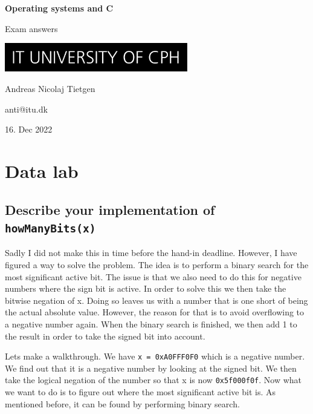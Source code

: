 \documentclass[11pt]{article}
\newcommand{\code}[1]{{\colorbox{lightgray!15}{\color{black}\texttt{#1}}}}
\begin{document}
\begin{titlepage}
    \begin{center}
        \huge
        \textbf{Operating systems and C}

        \vspace{0.5cm}
        Exam answers

        \vspace{3cm}
        \includegraphics[width=0.6\textwidth]{itu.jpeg}

        \vspace{3cm}
        \large
        Andreas Nicolaj Tietgen 
        
        anti@itu.dk

        \vfill
        16. Dec 2022
    \end{center}
\end{titlepage}

\newpage

\tableofcontents

\newpage
\section{Data lab}

\subsection{Describe your implementation of \code{howManyBits(x)}}
Sadly I did not make this in time before the hand-in deadline. However, I have figured a way to 
solve the problem. The idea is to perform a binary search for the most significant active bit.
The issue is that we also need to do this for negative numbers where the sign bit is active. In order to 
solve this we then take the bitwise negation of x. Doing so leaves us with a number that is one short of being the
actual absolute value. However, the reason for that is to avoid overflowing to a negative number again. 
When the binary search is finished, we then add 1 to the result in order to take the signed bit into account.

Lets make a walkthrough. We have \code{x = 0xA0FFF0F0} which is a negative number.
We find out that it is a negative number by looking at the signed bit. We then take the
logical negation of the number so that x is now \code{0x5f000f0f}. 
Now what we want to do is to figure out where the most significant active bit is. As mentioned before,
it can be found by performing binary search. 
\end{document}
